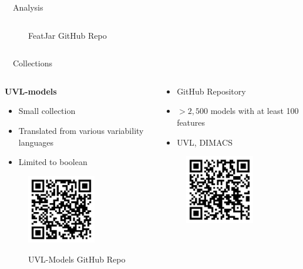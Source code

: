 \documentclass[
	aspectratio=169, %
	8pt, %
	nosectionframes, %
]{beamer}
\newcommand{\inlinesubtitle}[1]{\textcolor{gray!60}{~{}~#1}}
\begin{document}
\begin{frame}{\insertsection \inlinesubtitle{Analysis}}
\begin{columns}[t]
\begin{column}{0.49\textwidth}
\begin{figure}
                FeatJar GitHub Repo
            \end{figure}
		\end{column}
	\end{columns}
\end{frame}

\begin{frame}{\insertsection \inlinesubtitle{Collections}}
    \vspace{0.4cm}
    \begin{columns}[t]
		\begin{column}{0.3\textwidth}
			\textbf{UVL-models}
            \begin{itemize}
                \item Small collection
                \item Translated from various variability languages
                \item Limited to boolean
            \end{itemize}
            \begin{figure}
                \centering
                \includegraphics[width=3cm]{pics/qr/collection.pdf}
                
                UVL-Models GitHub Repo
            \end{figure}
		\end{column}%
		\begin{column}{0.3\textwidth}
            \begin{itemize}
                \item GitHub Repository
                \item $>2,500$ models with at least 100 features
                \item UVL, DIMACS
            \end{itemize}
            \begin{figure}
                \centering
                \includegraphics[width=3cm]{pics/qr/benchmark.pdf}
                

\end{figure}
\end{column}
\end{columns}
\end{frame}
\end{document}
